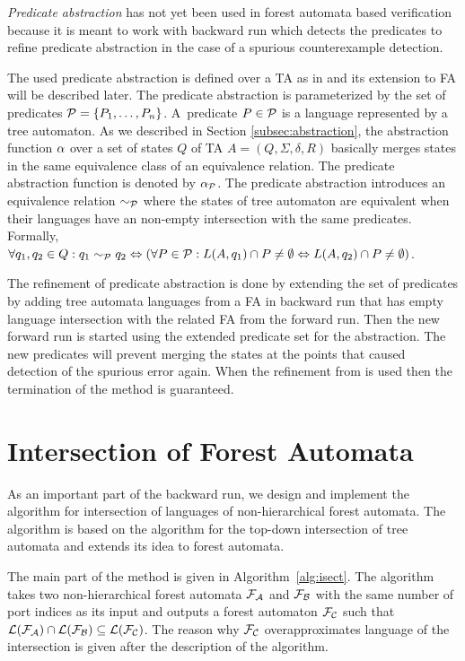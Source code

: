 \emph{Predicate abstraction} has not yet been used in forest automata based verification
because it is meant to work with backward run
which detects the predicates to refine predicate abstraction
in the case of a spurious counterexample detection.

The used predicate abstraction is defined over a TA as in \cite{artmc}
and its extension to FA will be described later.
The predicate abstraction is parameterized by the set of predicates $\mathcal{P}=\{P_1, \ldots, P_n\}$.
A~predicate $P \in \mathcal{P}$ is a language represented by
a tree automaton.
As we described in Section \ref{subsec:abstraction}, the abstraction function $\alpha$
over a set of states $Q$ of TA $A=(Q,\Sigma,\delta, R)$ basically
merges states in the same equivalence class of an equivalence relation.
The predicate abstraction function is denoted by $\alpha_{\mathcal{P}}$.
The predicate abstraction introduces an equivalence relation $\sim_{\mathcal{P}}$
where the states of tree automaton are equivalent when
their languages have an non-empty intersection with the same predicates.
Formally, $\forall q_1,q_2 \in Q: q_1 \sim_{\mathcal{P}} q_2 \Leftrightarrow
(\forall P \in \mathcal{P}: L(A,q_1) \cap P \neq \emptyset
\Leftrightarrow L(A,q_2) \cap P \neq \emptyset)$.

The refinement of predicate abstraction is done by extending the
set of predicates by adding tree automata languages from
a FA in backward run that has empty language
intersection with the related FA from the forward run.
Then the new forward run is started using the extended predicate
set for the abstraction.
The new predicates will prevent merging the states at the points
that caused detection of the spurious error again.
When the refinement from \cite{artmc} is used
then the termination of the method is guaranteed.

\section{Intersection of Forest Automata}
\label{sec:isect}
As an important part of the backward run,
we design and implement the algorithm for intersection
of languages of non-hierarchical forest automata.
The algorithm is based on the algorithm for the top-down
intersection of tree automata and extends its idea to forest automata.

The main part of the method is given in Algorithm~\ref{alg:isect}.
The algorithm takes two non-hierarchical forest automata $\mathcal{F}_{\mathcal{A}}$
and $\mathcal{F}_{\mathcal{B}}$ with the same number of port indices
as its input and outputs a forest automaton $\mathcal{F}_{\mathcal{C}}$ such that
$\mathcal{L}(\mathcal{F}_{\mathcal{A}}) \cap \mathcal{L}(\mathcal{F}_{\mathcal{B}}) \subseteq \mathcal{L}(\mathcal{F}_{\mathcal{C}})$.
The reason why $\mathcal{F}_{\mathcal{C}}$ overapproximates language
of the intersection is given after the description of the algorithm.

